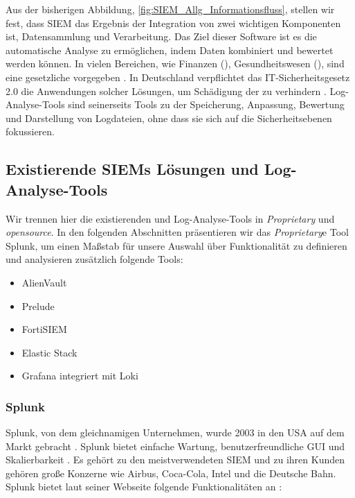 Aus der bisherigen Abbildung, \ref{fig:SIEM_Allg_Informationsfluss}, stellen wir fest, dass \gls{SIEM} das Ergebnis der Integration von zwei wichtigen Komponenten ist, Datensammlung und Verarbeitung. Das Ziel dieser Software ist es die automatische Analyse zu ermöglichen, indem Daten kombiniert und bewertet werden können. In vielen Bereichen, wie Finanzen (), Gesundheitswesen (), sind  eine gesetzliche vorgegeben \citep{Jog_SIEM}. In Deutschland verpflichtet das \gls{IT-Sicherheitsgesetz 2.0} die Anwendungen solcher Lösungen, um Schädigung der  zu verhindern \citep{BSI_ITSG}. Log-Analyse-Tools sind seinerseits Tools zu der Speicherung, Anpassung, Bewertung und Darstellung von Logdateien, ohne dass sie sich auf die Sicherheitsebenen fokussieren.

\subsection{Existierende SIEMs Lösungen und Log-Analyse-Tools}
Wir trennen hier die existierenden  und Log-Analyse-Tools in \textit{\gls{Proprietary}} und \textit{\gls{opensource}}. In den folgenden Abschnitten präsentieren wir das \textit{\gls{Proprietary}}e Tool Splunk, um einen Maßstab für unsere Auswahl über Funktionalität zu definieren und analysieren zusätzlich folgende Tools: %

\begin{itemize}[noitemsep]
   \item AlienVault  %
   \item Prelude %
   \item FortiSIEM %
   \item Elastic Stack %
   \item Grafana integriert mit Loki %
\end{itemize}

\subsubsection{Splunk}
Splunk, von dem gleichnamigen Unternehmen, wurde 2003 in den USA auf dem Markt gebracht \citep{Splunk_splunk}. Splunk bietet einfache Wartung, benutzerfreundliche \gls{GUI} und Skalierbarkeit \citep{Kazarov_Splunk}. Es gehört zu den meistverwendeten \gls{SIEM} und zu ihren Kunden gehören große Konzerne wie Airbus, Coca-Cola, Intel und die Deutsche Bahn. Splunk bietet laut seiner Webseite folgende Funktionalitäten an \citep{Splunk_SPE}:

